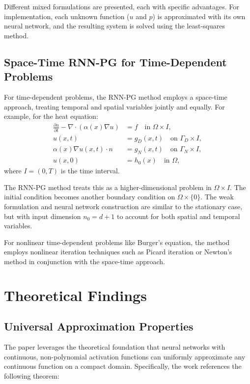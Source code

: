 \documentclass[11pt,a4paper]{article}
\begin{document}
Different mixed formulations are presented, each with specific advantages. For implementation, each unknown function ($u$ and $p$) is approximated with its own neural network, and the resulting system is solved using the least-squares method.

\subsection{Space-Time RNN-PG for Time-Dependent Problems}

For time-dependent problems, the RNN-PG method employs a space-time approach, treating temporal and spatial variables jointly and equally. For example, for the heat equation:
\begin{align}
\frac{\partial u}{\partial t} - \nabla \cdot(\alpha(x)\nabla u) &= f \quad \text{in } \Omega \times I, \\
u(x,t) &= g_D(x,t) \quad \text{on } \Gamma_D \times I, \\
\alpha(x)\nabla u(x,t) \cdot n &= g_N(x,t) \quad \text{on } \Gamma_N \times I, \\
u(x,0) &= h_0(x) \quad \text{in } \Omega,
\end{align}
where $I = (0,T)$ is the time interval.

The RNN-PG method treats this as a higher-dimensional problem in $\Omega \times I$. The initial condition becomes another boundary condition on $\Omega \times \{0\}$. The weak formulation and neural network construction are similar to the stationary case, but with input dimension $n_0 = d+1$ to account for both spatial and temporal variables.

For nonlinear time-dependent problems like Burger's equation, the method employs nonlinear iteration techniques such as Picard iteration or Newton's method in conjunction with the space-time approach.

\section{Theoretical Findings}

\subsection{Universal Approximation Properties}

The paper leverages the theoretical foundation that neural networks with continuous, non-polynomial activation functions can uniformly approximate any continuous function on a compact domain. Specifically, the work references the following theorem:
\end{document}
